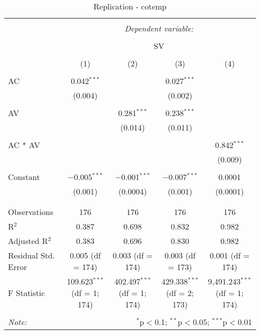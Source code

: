 
\begin{table}[!htbp] \centering 
  \caption{Replication - cotemp} 
  \label{} 
\begin{adjustbox}{width=1\textwidth}
	\begin{tabular}{@{\extracolsep{5pt}}lcccc} 
\\[-1.8ex]\hline 
\hline \\[-1.8ex] 
 & \multicolumn{4}{c}{\textit{Dependent variable:}} \\ 
\cline{2-5} 
\\[-1.8ex] & \multicolumn{4}{c}{SV} \\ 
\\[-1.8ex] & (1) & (2) & (3) & (4)\\ 
\hline \\[-1.8ex] 
 AC & 0.042$^{***}$ &  & 0.027$^{***}$ &  \\ 
  & (0.004) &  & (0.002) &  \\ 
  & & & & \\ 
 AV &  & 0.281$^{***}$ & 0.238$^{***}$ &  \\ 
  &  & (0.014) & (0.011) &  \\ 
  & & & & \\ 
 AC * AV &  &  &  & 0.842$^{***}$ \\ 
  &  &  &  & (0.009) \\ 
  & & & & \\ 
 Constant & $-$0.005$^{***}$ & $-$0.001$^{***}$ & $-$0.007$^{***}$ & 0.0001 \\ 
  & (0.001) & (0.0004) & (0.001) & (0.0001) \\ 
  & & & & \\ 
\hline \\[-1.8ex] 
Observations & 176 & 176 & 176 & 176 \\ 
R$^{2}$ & 0.387 & 0.698 & 0.832 & 0.982 \\ 
Adjusted R$^{2}$ & 0.383 & 0.696 & 0.830 & 0.982 \\ 
Residual Std. Error & 0.005 (df = 174) & 0.003 (df = 174) & 0.003 (df = 173) & 0.001 (df = 174) \\ 
F Statistic & 109.623$^{***}$ (df = 1; 174) & 402.497$^{***}$ (df = 1; 174) & 429.338$^{***}$ (df = 2; 173) & 9,491.243$^{***}$ (df = 1; 174) \\ 
\hline 
\hline \\[-1.8ex] 
\textit{Note:}  & \multicolumn{4}{r}{$^{*}$p$<$0.1; $^{**}$p$<$0.05; $^{***}$p$<$0.01} \\ 
\end{tabular} 
\end{adjustbox}
\end{table} 

